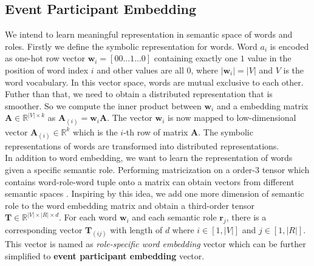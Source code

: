 \documentclass[a4paper]{article}
\begin{document}
\subsection{Event Participant Embedding}
We intend to learn meaningful representation in semantic space of words and roles. Firstly we define the symbolic representation for words. Word $a_i$ is encoded as one-hot row vector $\mathbf{w}_i = [00...1...0]$ containing exactly one $1$ value in the position of word index $i$ and other values are all $0$, where $|\mathbf{w}_i| = |V|$ and $V$ is the word vocabulary. In this vector space, words are mutual exclusive to each other.  \\
\noindent
Futher than that, we need to obtain a distributed representation that is smoother. So we compute the inner product between $\mathbf{w}_i$ and a embedding matrix $\mathbf{A} \in \mathbb{R}^{|V| \times k}$ as $\mathbf{A}_{(i)} = \mathbf{w}_i \mathbf{A}$. The vector $\mathbf{w}_i$ is now mapped to low-dimensional vector $\mathbf{A}_{(i)} \in \mathbb{R}^k$ which is the $i$-th row of matrix $\mathbf{A}$. The symbolic representations of words are transformed into distributed representations. \\
\noindent
In addition to word embedding, we want to learn the representation of words given a specific semantic role. Performing matricization on a order-3 tensor which contains word-role-word tuple onto a matrix can obtain vectors from different semantic spaces \citep{baroni2010distributional}. Inspiring by this idea, we add one more dimension of semantic role to the word embedding matrix and obtain a third-order tensor $\mathbf{T} \in \mathbb{R}^{|V| \times |R| \times d}$. For each word $\mathbf{w}_i$ and each semantic role $\mathbf{r}_j$, there is a corresponding vector $\mathbf{T}_{(ij)}$ with length of $d$ where $i \in [1, |V|]$ and $j \in [1, |R|]$. This vector is named as \textit{role-specific word embedding} vector \citep{tilk2016event} which can be further simplified to \textbf{event participant embedding} vector.
\end{document}
